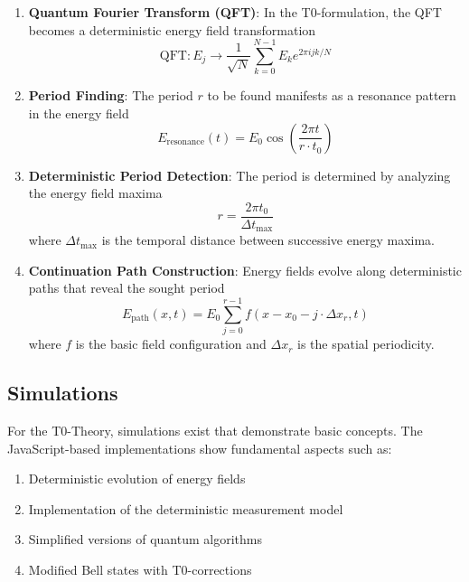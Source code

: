 \documentclass[12pt,a4paper]{article}
\theoremstyle{definition}
\begin{document}
	\begin{enumerate}
		\item \textbf{Quantum Fourier Transform (QFT)}: In the T0-formulation, the QFT becomes a deterministic energy field transformation
		\begin{equation}
			\text{QFT}: E_j \rightarrow \frac{1}{\sqrt{N}} \sum_{k=0}^{N-1} E_k e^{2\pi i jk/N}
		\end{equation}
		
		\item \textbf{Period Finding}: The period $r$ to be found manifests as a resonance pattern in the energy field
		\begin{equation}
			E_{\text{resonance}}(t) = E_0 \cos\left(\frac{2\pi t}{r \cdot t_0}\right)
		\end{equation}
		
		\item \textbf{Deterministic Period Detection}: The period is determined by analyzing the energy field maxima
		\begin{equation}
			r = \frac{2\pi t_0}{\Delta t_{\text{max}}}
		\end{equation}
		where $\Delta t_{\text{max}}$ is the temporal distance between successive energy maxima.
		
		\item \textbf{Continuation Path Construction}: Energy fields evolve along deterministic paths that reveal the sought period
		\begin{equation}
			E_{\text{path}}(x,t) = E_0 \sum_{j=0}^{r-1} f(x - x_0 - j \cdot \Delta x_r, t)
		\end{equation}
		where $f$ is the basic field configuration and $\Delta x_r$ is the spatial periodicity.
	\end{enumerate}
	
	\subsection{Simulations}
	
	For the T0-Theory, simulations exist that demonstrate basic concepts. The JavaScript-based implementations show fundamental aspects such as:
	
	\begin{enumerate}
		\item Deterministic evolution of energy fields
		\item Implementation of the deterministic measurement model
		\item Simplified versions of quantum algorithms
		\item Modified Bell states with T0-corrections
	\end{enumerate}
	
\end{document}
